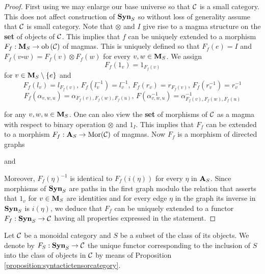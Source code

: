 \begin{proof}
First using {\cite[Introduction]{Presheaves}} we may enlarge our base universe so that ${\mathcal C}$ is a small category. This does not affect construction of $\mathbf{Syn}_S$ so without loss of generality assume that ${\mathcal C}$ is small category. Note that $\otimes$ and $I$ give rise to a magma structure on the \textbf{set} of objects of ${\mathcal C}$. This implies that $f$ can be uniquely extended to a morphism $F_f:\mathbf{M}_S\rightarrow \mathrm{ob}\left({\mathcal C}\right)$ of magmas. This is uniquely defined so that $F_f(e) = I$ and $F_f(v\square w) = F_f(v)\otimes F_f(w)$ for every $v, w\in \mathbf{M}_S$. We assign
$$F_f(1_v)= 1_{F_f(v)}$$
for $v\in \mathbf{M}_S\setminus \{e\}$ and
$$F_f(l_v) = l_{F_f(v)},\,F_f(l_v^{-1})=l^{-1}_v,\,F_f(r_v) = r_{F_f(v)},\,F_f(r^{-1}_v)=r^{-1}_v$$
$$F_f(\alpha_{v,w,u}) = \alpha_{F_f(v),F_f(w),F_f(u)},\,F(\alpha^{-1}_{v,w,u})=\alpha^{-1}_{F_f(v),F_f(w),F_f(u)}$$

for any $v,w,u\in \mathbf{M}_S$. One can also view the \textbf{set} of morphisms of ${\mathcal C}$ as a magma with respect to binary operation $\otimes$ and $1_I$. This implies that $F_f$ can be extended to a morphism $F_f:\mathbf{A}_S\rightarrow \mathrm{Mor}({\mathcal C})$ of magmas. Now $F_f$ is a morphism of directed graphs
\begin{center}
\end{center}
and
\begin{center}
\end{center}
Moreover, $F_f(\eta)^{-1}$ is identical to $F_f(i(\eta))$ for every $\eta$ in $\mathbf{A}_S$. Since morphisms of $\mathbf{Syn}_S$ are paths in the first graph modulo the relation that asserts that $1_v$ for $v\in \mathbf{M}_S$ are identities and for every edge $\eta$ in the graph its inverse in $\mathbf{Syn}_S$ is $i(\eta)$, we deduce that $F_f$ can be uniquely extended to a functor $F_f:\mathbf{Syn}_S\rightarrow {\mathcal C}$ having all properties expressed in the statement.
\end{proof}
\noindent
Let ${\mathcal C}$ be a monoidal category and $S$ be a subset of the class of its objects. We denote by $F_S:\mathbf{Syn}_S\rightarrow {\mathcal C}$ the unique functor corresponding to the inclusion of $S$ into the class of objects in ${\mathcal C}$ by means of Proposition \ref{proposition:syntactictensorcategory}.

